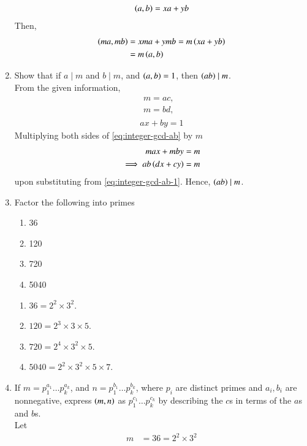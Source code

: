 \begin{enumerate}[label=\arabic*.,ref=\thesubsection.\theenumi]
\begin{align}
			\left(a,b\right) = xa+yb
		\end{align}
		Then, 
		\begin{align}
			\left(ma,mb\right) &= xma + ymb = m\left(xa+yb\right)
			\\
			&= m \left(a,b\right)
		\end{align}
	\item Show that if $a \mid m$ and $b \mid m$, and $\left(a,b\right) = 1$, then $\left(ab\right) \mid m$.
		\\
		\solution From the given information, 
		\begin{align}
			\label{eq:integer-gcd-ab-1}
			\begin{split}
			m = ac, 
			\\
			m = bd, 
			\end{split}
			\\
			ax+by = 1
			\label{eq:integer-gcd-ab}
		\end{align}
		Multiplying both sides of 
			\eqref{eq:integer-gcd-ab}
			by $m$
		\begin{align}
			max+mby &= m
			\\
			\implies ab\left(dx+cy\right) &=m
		\end{align}
		upon substituting from 
			\eqref{eq:integer-gcd-ab-1}.  Hence, $\left(ab\right)\mid m$.
		\item Factor the following into primes
\begin{enumerate}
	\item 36
	\item 120
	\item 720
	\item 5040
\end{enumerate}
\solution 
\begin{enumerate}
\item $36 = 2^2\times 3^2$.
\item $120 = 2^3\times 3 \times 5$.
\item $720 = 2^4\times 3^2 \times 5$.
\item $5040 = 2^2\times 3^2 \times 5 \times 7$.
\end{enumerate}
\item If $m = p_{1}^{a_1} \dots p_{k}^{a_k}$, and 
$n = p_{1}^{b_1} \dots p_{k}^{b_k}$, where $p_i$ are distinct primes and $a_i, b_i$ are nonnegative, express
$\left(m,n\right)$ as $ p_{1}^{c_1} \dots p_{k}^{c_k}$ by describing the $c$s in terms of the $a$s and $b$s.
\\
\solution Let 
\begin{align}
	m &= 36 = 2^2\times 3^2
\\

\end{align}
\end{enumerate}
